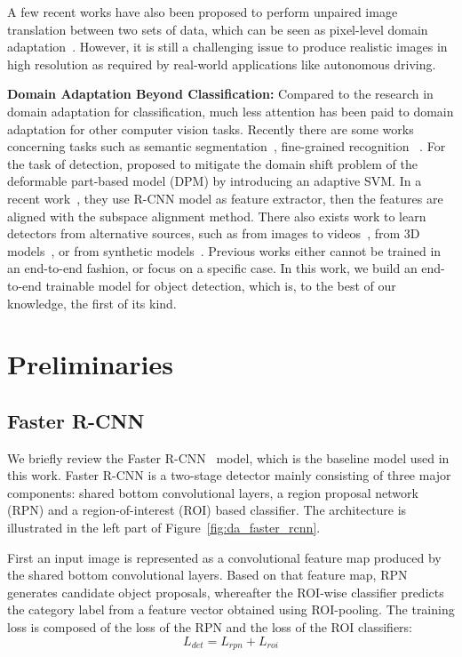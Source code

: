 \documentclass[10pt,twocolumn,letterpaper]{article}
\begin{document}
A few recent works have also been proposed to perform unpaired image translation between two sets of data, which can be seen as pixel-level domain adaptation~\cite{zhu2017unpaired,kim2017learning,yi2017dualgan,liu2017unsupervised}. However, it is still a challenging issue to produce realistic images in high resolution as required by real-world applications like autonomous driving. 

\textbf{Domain Adaptation Beyond Classification:} Compared to the research in domain adaptation for classification, much less attention has been paid to domain adaptation for other computer vision tasks. Recently there are some works concerning tasks such as semantic segmentation~\cite{chen2017road, hoffman2016fcns,zhang2017curriculum}, fine-grained recognition~\cite{gebru2017fine} \etc. For the task of detection, \cite{xu2014domain} proposed to mitigate the domain shift problem of the deformable part-based model (DPM) by introducing an adaptive SVM. In a recent work~\cite{raj2015subspace}, they use R-CNN model as feature extractor, then the features are aligned with the subspace alignment method. There also exists work to learn detectors from alternative sources, such as from images to videos~\cite{tang2012shifting}, from 3D models~\cite{peng2015learning,sun2014virtual}, or from synthetic models~\cite{hattori2015learning}. Previous works either cannot be trained in an end-to-end fashion, or focus on a specific case. In this work, we build an end-to-end trainable model for object detection, which is, to the best of our knowledge, the first of its kind. 

\section{Preliminaries}
\subsection{Faster R-CNN} 
We briefly review the Faster R-CNN~\cite{zhang2016Faster} model, which is the baseline model used in this work. Faster R-CNN is a two-stage detector mainly consisting of three major components: shared bottom convolutional layers, a region proposal network (RPN) and a region-of-interest (ROI) based classifier. The architecture is illustrated in the left part of Figure~\ref{fig:da_faster_rcnn}. 

First an input image is represented as a convolutional feature map produced by the shared bottom convolutional layers. Based on that feature map, RPN generates candidate object proposals, whereafter the ROI-wise classifier predicts the category label from a feature vector obtained using ROI-pooling. The training loss is composed of the loss of the RPN and the loss of the ROI classifiers: 
\begin{equation}
L_{det} = L_{rpn} + L_{roi}
\end{equation}
\end{document}
